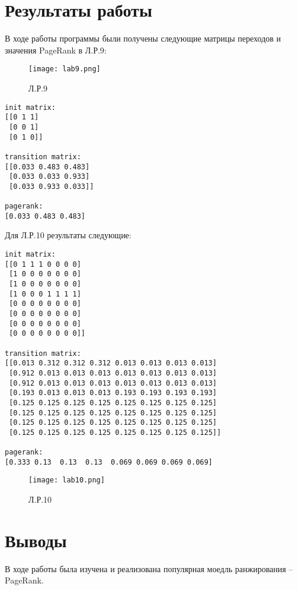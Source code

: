 \documentclass[12pt]{article}
\begin{document}
    
    {
       \section{Результаты работы}
        
    }
    
    В ходе работы программы были получены следующие матрицы переходов и значения PageRank в Л.Р.9:
    
    
           \begin{figure}
\centering
\texttt{[image: lab9.png]}
\caption{Л.Р.9}
\label{lab9}
\end{figure}
    
    \begin{verbatim}
init matrix:
[[0 1 1]
 [0 0 1]
 [0 1 0]]

transition matrix:
[[0.033 0.483 0.483]
 [0.033 0.033 0.933]
 [0.033 0.933 0.033]]

pagerank:
[0.033 0.483 0.483]
 \end{verbatim}
 

 
 Для Л.Р.10 результаты следующие:
    
    \begin{verbatim}
init matrix:
[[0 1 1 1 0 0 0 0]
 [1 0 0 0 0 0 0 0]
 [1 0 0 0 0 0 0 0]
 [1 0 0 0 1 1 1 1]
 [0 0 0 0 0 0 0 0]
 [0 0 0 0 0 0 0 0]
 [0 0 0 0 0 0 0 0]
 [0 0 0 0 0 0 0 0]]

transition matrix:
[[0.013 0.312 0.312 0.312 0.013 0.013 0.013 0.013]
 [0.912 0.013 0.013 0.013 0.013 0.013 0.013 0.013]
 [0.912 0.013 0.013 0.013 0.013 0.013 0.013 0.013]
 [0.193 0.013 0.013 0.013 0.193 0.193 0.193 0.193]
 [0.125 0.125 0.125 0.125 0.125 0.125 0.125 0.125]
 [0.125 0.125 0.125 0.125 0.125 0.125 0.125 0.125]
 [0.125 0.125 0.125 0.125 0.125 0.125 0.125 0.125]
 [0.125 0.125 0.125 0.125 0.125 0.125 0.125 0.125]]

pagerank:
[0.333 0.13  0.13  0.13  0.069 0.069 0.069 0.069]
 \end{verbatim}
    	
    	
   \begin{figure}
\centering
\texttt{[image: lab10.png]}
\caption{Л.Р.10}
\label{lab10}
\end{figure}
    	
    	
        {
       \section {Выводы}
        
    }
        
        В ходе работы была изучена и реализована популярная моедль ранжирования -- PageRank.
   
    
\end{document}
